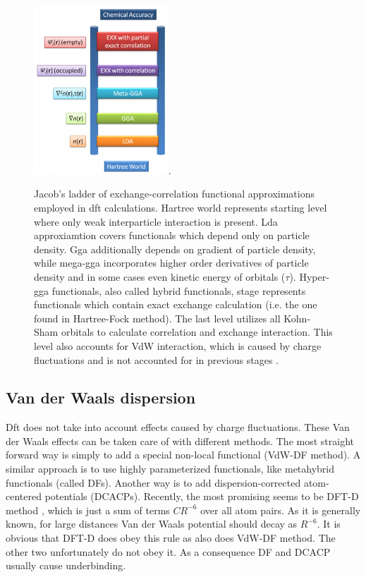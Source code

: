\documentclass[openany, longbibliography,slovene,a4paper,12pt]{article}
\begin{document}
\begin{figure}
  \centering
  \includegraphics[width=0.45\textwidth]{jacobs_functional_ladder_ver2.png}.
  \caption{Jacob’s ladder of exchange-correlation functional approximations
    employed in dft calculations. Hartree world represents starting level where only
    weak interparticle interaction is present. Lda approxiamtion covers
    functionals which depend only on particle density. Gga additionally depends
    on gradient of particle density, while mega-gga incorporates higher order
    derivatives of particle density and in some cases even kinetic energy of
    orbitals ($\tau$). Hyper-gga functionals, also called hybrid functionals,
    stage represents functionals which contain exact exchange calculation (i.e.
    the one found in Hartree-Fock method). The last level utilizes all Kohn-Sham
    orbitals to calculate correlation and exchange interaction. This level also
    accounts for VdW interaction, which is caused by charge fluctuations and is
    not accounted for in previous stages \cite{How_theo_simul_can_address}.
  }
  \label{bijection}
\end{figure}

\subsection{Van der Waals dispersion}
Dft does not take into account effects caused by charge fluctuations. These Van
der Waals effects can be taken care of with different methods.
The most straight
forward way is simply to add a special non-local functional (VdW-DF method). A similar
approach is to use highly parameterized functionals, like metahybrid
functionals (called DFs). Another way is to add dispersion-corrected
atom-centered potentials (DCACPs). Recently, the most promising seems to be DFT-D method
\cite{consis_accur_ab_initio_param}, which is just a sum of terms $CR^{-6}$
over all atom pairs. As it is generally known, for large distances Van der Waals
potential should decay as $R^{-6}$. It is obvious that DFT-D does obey this
rule as also does VdW-DF method. The other two unfortunately do not obey it. As
a consequence DF and DCACP usually cause underbinding.
\end{document}
